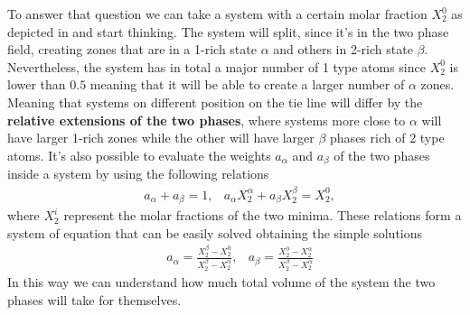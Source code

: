 To answer that question we can take a system with a certain molar fraction $X_2^0$ as depicted in  and start thinking. The system will split, since it's in the two phase field, creating zones that are in a 1-rich state $\alpha$ and others in 2-rich state $\beta$. Nevertheless, the system has in total a major number of 1 type atoms since $X_2^0$ is lower than $0.5$ meaning that it will be able to create a larger number of $\alpha$ zones. Meaning that systems on different position on the tie line will differ by the \textbf{relative extensions of the two phases}, where systems more close to $\alpha$ will have larger 1-rich zones while the other will have larger $\beta$ phases rich of 2 type atoms. It's also possible to evaluate the weights $a_\alpha$ and $a_\beta$ of the two phases inside a system by using the following relations
\begin{align}
    &a_\alpha + a_\beta = 1, &a_\alpha X_2^\alpha + a_\beta X_2^\beta = X_2^0,
\end{align}
where $X_2^i$ represent the molar fractions of the two minima. These relations form a system of equation that can be easily solved obtaining the simple solutions
\begin{align}
    \label{eq:weightPhases}
    &a_\alpha = \frac{X_2^\beta - X_2^0}{X_2^\beta - X_2^\alpha}, &a_\beta = \frac{X_2^0 - X_2^\alpha}{X_2^\beta - X_2^\alpha}
\end{align}
In this way we can understand how much total volume of the system the two phases will take for themselves.

